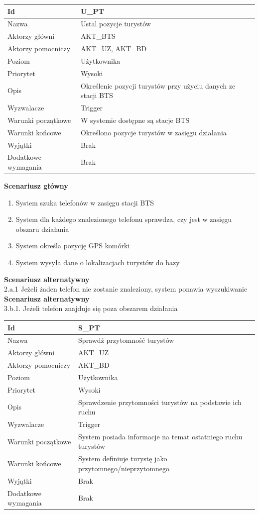 \documentclass[a4paper,12pt]{article}
\begin{document}
\begin{longtable}{| p{5cm} | p{10cm} |}
\hline
Id & U\_PT \\\hline
Nazwa & Ustal pozycje turystów \\\hline
Aktorzy główni & AKT\_BTS \\\hline
Aktorzy pomocniczy & AKT\_UZ, AKT\_BD \\\hline
Poziom & Użytkownika \\\hline
Priorytet & Wysoki \\\hline
Opis & Określenie pozycji turystów przy użyciu danych ze stacji BTS \\\hline
Wyzwalacze & Trigger \\\hline
Warunki początkowe & W systemie dostępne są stacje BTS \\\hline
Warunki końcowe & Określono pozycje turystów w zasięgu działania \\\hline
Wyjątki & Brak \\\hline
Dodatkowe wymagania & Brak \\\hline
\end{longtable}
\textbf{Scenariusz główny}
\begin{enumerate}
\item System szuka telefonów w zasięgu stacji BTS
\item System dla każdego znalezionego telefonu sprawdza, czy jest w zasięgu obszaru działania
\item System określa pozycję GPS komórki
\item System wysyła dane o lokalizacjach turystów do bazy
\end{enumerate}
\textbf{Scenariusz alternatywny} \\
2.a.1 Jeżeli żaden telefon nie zostanie znaleziony, system ponawia wyszukiwanie\\
\textbf{Scenariusz alternatywny}\\
3.b.1. Jeżeli telefon znajduje się poza obszarem działania
\newpage
\begin{longtable}{| p{5cm} | p{10cm} |}
\hline
Id & S\_PT \\\hline
Nazwa & Sprawdź przytomność turystów \\\hline
Aktorzy główni & AKT\_UZ \\\hline
Aktorzy pomocniczy & AKT\_BD \\\hline
Poziom & Użytkownika \\\hline
Priorytet & Wysoki \\\hline
Opis & Sprawdzenie przytomności turystów na podstawie ich ruchu \\\hline
Wyzwalacze & Trigger \\\hline
Warunki początkowe & System posiada informacje na temat ostatniego ruchu turystów \\\hline
Warunki końcowe & System definiuje turystę jako przytomnego/nieprzytomnego \\\hline
Wyjątki & Brak \\\hline
Dodatkowe wymagania & Brak \\\hline
\end{longtable}
\end{document}
